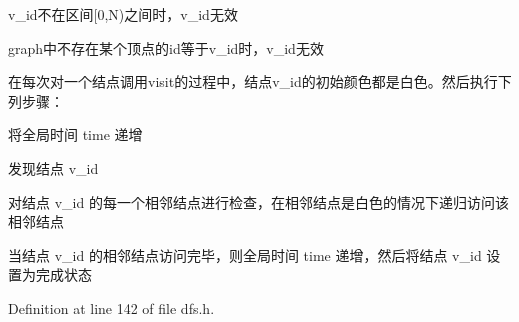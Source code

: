 \begin{DoxyItemize}
\item {\ttfamily v\+\_\+id}不在区间{\ttfamily \mbox{[}0,N)}之间时，{\ttfamily v\+\_\+id}无效
\item {\ttfamily graph}中不存在某个顶点的{\ttfamily id}等于{\ttfamily v\+\_\+id}时，{\ttfamily v\+\_\+id}无效
\end{DoxyItemize}

在每次对一个结点调用visit的过程中，结点v\+\_\+id的初始颜色都是白色。然后执行下列步骤：


\begin{DoxyItemize}
\item 将全局时间 time 递增
\item 发现结点 v\+\_\+id
\item 对结点 v\+\_\+id 的每一个相邻结点进行检查，在相邻结点是白色的情况下递归访问该相邻结点
\item 当结点 v\+\_\+id 的相邻结点访问完毕，则全局时间 time 递增，然后将结点 v\+\_\+id 设置为完成状态 
\end{DoxyItemize}

Definition at line 142 of file dfs.\+h.

